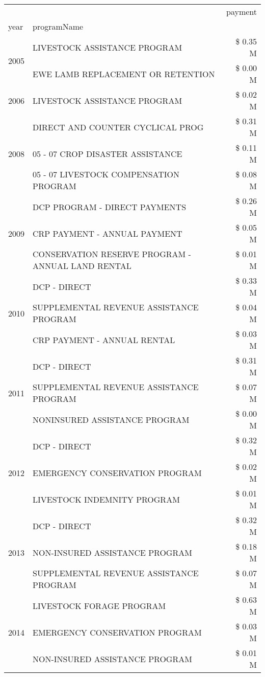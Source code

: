 \begin{tabular}{llr}
\toprule
 &  & payment \\
year & programName &  \\
\midrule
\multirow[t]{2}{*}{2005} & LIVESTOCK ASSISTANCE PROGRAM & \$ 0.35 M \\
 & EWE LAMB REPLACEMENT OR RETENTION & \$ 0.00 M \\
\cline{1-3}
2006 & LIVESTOCK ASSISTANCE PROGRAM & \$ 0.02 M \\
\cline{1-3}
\multirow[t]{3}{*}{2008} & DIRECT AND COUNTER CYCLICAL PROG & \$ 0.31 M \\
 & 05 - 07 CROP DISASTER ASSISTANCE & \$ 0.11 M \\
 & 05 - 07 LIVESTOCK COMPENSATION PROGRAM & \$ 0.08 M \\
\cline{1-3}
\multirow[t]{3}{*}{2009} & DCP PROGRAM - DIRECT PAYMENTS & \$ 0.26 M \\
 & CRP PAYMENT - ANNUAL PAYMENT & \$ 0.05 M \\
 & CONSERVATION RESERVE PROGRAM - ANNUAL LAND RENTAL & \$ 0.01 M \\
\cline{1-3}
\multirow[t]{3}{*}{2010} & DCP - DIRECT & \$ 0.33 M \\
 & SUPPLEMENTAL REVENUE ASSISTANCE PROGRAM & \$ 0.04 M \\
 & CRP PAYMENT - ANNUAL RENTAL & \$ 0.03 M \\
\cline{1-3}
\multirow[t]{3}{*}{2011} & DCP - DIRECT & \$ 0.31 M \\
 & SUPPLEMENTAL REVENUE ASSISTANCE PROGRAM & \$ 0.07 M \\
 & NONINSURED ASSISTANCE PROGRAM & \$ 0.00 M \\
\cline{1-3}
\multirow[t]{3}{*}{2012} & DCP - DIRECT & \$ 0.32 M \\
 & EMERGENCY CONSERVATION PROGRAM & \$ 0.02 M \\
 & LIVESTOCK INDEMNITY PROGRAM & \$ 0.01 M \\
\cline{1-3}
\multirow[t]{3}{*}{2013} & DCP - DIRECT & \$ 0.32 M \\
 & NON-INSURED ASSISTANCE PROGRAM & \$ 0.18 M \\
 & SUPPLEMENTAL REVENUE ASSISTANCE PROGRAM & \$ 0.07 M \\
\cline{1-3}
\multirow[t]{3}{*}{2014} & LIVESTOCK FORAGE PROGRAM & \$ 0.63 M \\
 & EMERGENCY CONSERVATION PROGRAM & \$ 0.03 M \\
 & NON-INSURED ASSISTANCE PROGRAM & \$ 0.01 M \\
\cline{1-3}

\end{tabular}
